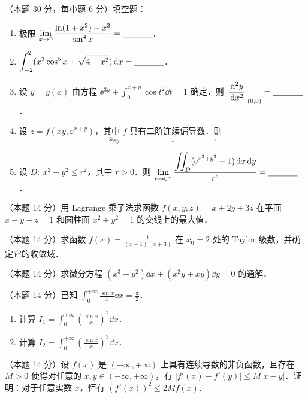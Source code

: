 
\begin{problems}
\item[一、]（本题 30 分，每小题 6 分）填空题：
\begin{enumerate}
  \item 极限 $\displaystyle \lim_{x\to 0}\frac{\ln(1+x^2)-x^2}{\sin^4 x}=\underline{\hspace{3.5em}}$．
  \item $\displaystyle \int_{-2}^{2}(x^3\cos^5 x+\sqrt{4-x^2})\,\mathrm{d} x=\underline{\hspace{3.5em}}$．
  \item 设 $y=y(x)$ 由方程 $\displaystyle \ee^{3y}+\int_0^{x+y}\cos t^2\dd t=1$ 确定．则 $\displaystyle \left.\frac{\,\mathrm{d}^2 y}{\,\mathrm{d} x^2}\right|_{(0,0)}=\underline{\hspace{3.5em}}$．
  \item 设 $z=f(xy,\ee^{x+y})$，其中 $f$ 具有二阶连续偏导数．则
  \[
    z_{xy}=\underline{\hspace{10em}}.
  \]
  \item 设 $D:\ x^2+y^2\le r^2$，其中 $r>0$．则 $\displaystyle \lim_{r\to 0^+}\frac{\displaystyle \iint_D (\mathrm{e}^{x^2+y^2}-1)\,\mathrm{d} x\,\mathrm{d} y}{r^4}=\underline{\hspace{3.5em}}$．
\end{enumerate}

\item[二、]（本题 14 分）用 Lagrange 乘子法求函数 $f(x,y,z)=x+2y+3z$ 在平面 $x-y+z=1$ 和圆柱面 $x^2+y^2=1$ 的交线上的最大值．

\item[三、]（本题 14 分）求函数 $\displaystyle f(x)=\frac{1}{(x-1)(x+3)}$ 在 $x_0=2$ 处的 Taylor 级数，并确定它的收敛域．

\item[四、]（本题 14 分）求微分方程 $(x^3-y^2)\dd x+(x^2y+xy)\dd y=0$ 的通解．

\item[五、]（本题 14 分）已知 $\displaystyle \int_0^{+\infty}\frac{\sin x}{x}\dd x=\frac{\pi}{2}$．
\begin{enumerate}
  \item 计算 $\displaystyle I_1=\int_0^{+\infty}\left(\frac{\sin x}{x}\right)^2\dd x$．
  \item 计算 $\displaystyle I_2=\int_0^{+\infty}\left(\frac{\sin x}{x}\right)^3\dd x$．
\end{enumerate}

\item[六、]（本题 14 分）设 $f(x)$ 是 $(-\infty,+\infty)$ 上具有连续导数的非负函数，且存在 $M>0$ 使得对任意的 $x,y\in(-\infty,+\infty)$，有 $|f'(x)-f'(y)|\le M|x-y|$．证明：对于任意实数 $x$，恒有 $(f'(x))^2\le 2Mf(x)$．
\end{problems}

